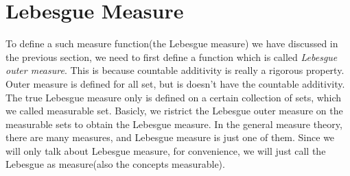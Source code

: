 \documentclass[lang=en, 12pt]{elegantbook}
\begin{document}
    \chapter{Lebesgue Measure}
        To define a such measure function(the Lebesgue measure) we have discussed in the previous section, we need to first define a function
    which is called \emph{Lebesgue outer measure}. This is because countable additivity is really a rigorous property. Outer measure is defined
    for all set, but is doesn't have the countable additivity. The true Lebesgue measure only is defined on a certain collection of sets, which
    we called measurable set. Basicly, we ristrict the Lebesgue outer measure on the measurable sets to obtain the Lebesgue measure. In the 
    general measure theory, there are many measures, and Lebesgue measure is just one of them. Since we will only talk about Lebesgue measure,
    for convenience, we will just call the Lebesgue as measure(also the concepts measurable).
\end{document}
